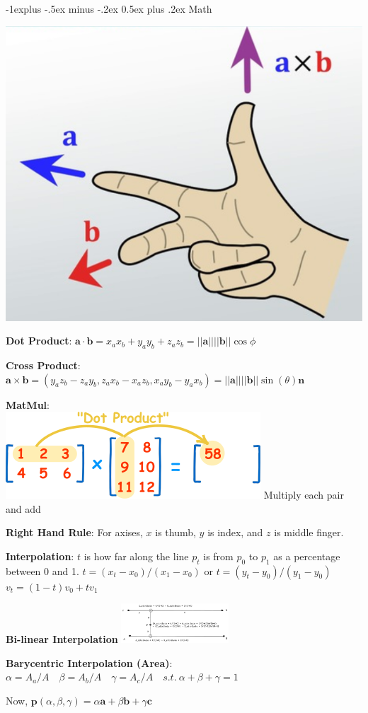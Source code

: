 \documentclass[letterpaper, 8pt]{extarticle}
\makeatletter
\renewcommand{\section}{\@startsection{section}{1}{0mm}%
                                {-1explus -.5ex minus -.2ex}%
                                {0.5ex plus .2ex}%
                                {\normalfont\normalsize\bfseries}}
\makeatother
\begin{document}
\begin{multicols*}{4}

\section{Math}

\includegraphics[width=.3\linewidth]{right-hand-rule.png}

\textbf{Dot Product}:
\(
\mathbf{a} \cdot \mathbf{b}
= x_a x_b + y_a y_b + z_a z_b
= ||\mathbf{a}|| ||\mathbf{b}|| \cos \phi
\)

\textbf{Cross Product}:
\(
\mathbf{a} \times \mathbf{b}
= (y_a z_b - z_a y_b, z_a x_b - x_a z_b, x_a y_b - y_a x_b)
= ||\mathbf{a}|| ||\mathbf{b}|| \sin(\theta) \mathbf{n}
\)

\textbf{MatMul}:\\
\includegraphics[width=0.3\linewidth]{matrix-multiply-a.png}
Multiply each pair and add

\textbf{Right Hand Rule}:
For axises, $x$ is thumb, $y$ is index, and $z$ is middle finger.

\textbf{Interpolation}:
\(t\) is how far along the line \(p_t\) is from \(p_0\) to \(p_1\) as a percentage between 0 and 1.
\(
t = (x_t - x_0) / (x_1 - x_0)
\text{ or }
t = (y_t - y_0) / (y_1 - y_0)
\)
\(
v_t = (1-t) v_0 + t v_1
\)

\textbf{Bi-linear Interpolation}
\includegraphics[width=4cm]{bilinear-interpolation.png}

\textbf{Barycentric Interpolation (Area)}:
\(
\alpha = A_a / A \quad
\beta = A_b / A \quad
\gamma = A_c / A \quad
s.t.\ \alpha + \beta + \gamma = 1
\)

Now,
\(
\mathbf{p}(\alpha, \beta, \gamma)
= \alpha \mathbf{a} + \beta \mathbf{b} + \gamma \mathbf{c}
\)


\end{multicols*}
\end{document}
